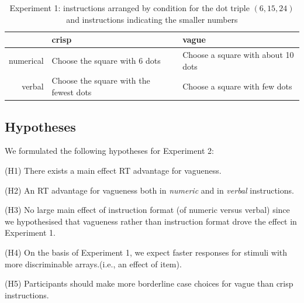 \documentclass[%
man,		%
floatsintext,%
apacite%
]{apa6}
\begin{document}

\begin{table}[htbp]
\caption{Experiment 1: instructions arranged by condition for the dot triple $(6,15,24)$ and instructions indicating the smaller numbers}
\label{instre3}
\begin{tabular}{rll}
&crisp&vague\\
\midrule
numerical	&	Choose the square with 6 dots 			& 	Choose a square with about 10 dots	\\
verbal	&	Choose the square with the fewest dots	&	Choose a square with few dots		\\
\midrule
\end{tabular}
\end{table}

\subsection{Hypotheses} %
\noindent We formulated the following hypotheses for Experiment 2:

{\small
\begin{APAenumerate}
	\item [(H1)] There exists a main effect RT advantage for vagueness.
	\item [(H2)] An RT advantage for vagueness both in \emph{numeric} and in \emph{verbal} instructions.
	\item [(H3)] No large main effect of instruction format (of numeric versus verbal) since we hypothesised that vagueness rather than instruction format drove the effect in Experiment 1.
	\item [(H4)] On the basis of Experiment 1, we expect faster responses for stimuli with more discriminable arrays.(i.e., an effect of item).
	\item [(H5)] Participants should make more borderline case choices for vague than crisp instructions.
\end{APAenumerate}
}
\end{document}

